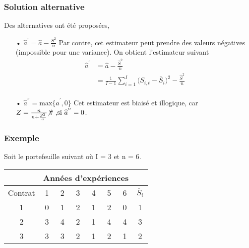 \documentclass[11pt,french]{report}
\begin{document}
\subsubsection*{Solution alternative}
Des alternatives ont été proposées,
\begin{itemize}
\item[•] $\widehat{a}^{'} = \widehat{a} - \frac{S^2}{n}$ Par contre, cet estimateur peut prendre des valeurs négatives (impossible pour une variance). On obtient l'estimateur suivant 
\begin{align*}
\widehat{a}^{'} &= \widehat{a} - \frac{\widehat{S}^2}{n} \\
&= \frac{1}{I-1} \sum_{i=1}^{I} \big( S_{i,t} -\overline{S}_i \big)^2 - \frac{\widehat{S}^2}{n} \\
\end{align*}
\item[•] $\widehat{a}^{''} = \text{max}\lbrace \widehat{a}^{'}, 0 \rbrace$ Cet estimateur est biaisé et illogique, car $Z = \frac{n}{n + \frac{S^2}{a}} {\not\forall}  \text{ ,si } \widehat{a}^{''} = 0 $.
\end{itemize}

\subsubsection*{Exemple}
Soit le portefeuille suivant où I = 3 et n = 6.


\begin{tabular}{|c|c|c|c|c|c|c|c|}
  \hline
   & \multicolumn{6}{c|}{Années d'expériences} & \\
  \hline
  Contrat & 1 & 2 & 3 & 4 & 5 & 6 & $\overline{S}_i$ \\
  \hline
  1 & 0 & 1 & 2 & 1 & 2 & 0 & 1\\
  2 & 3 & 4 & 2 & 1 & 4 & 4 & 3\\
  3 & 3 & 3 & 2 & 1 & 2 & 1 & 2\\
  \hline
\end{tabular}
\end{document}
